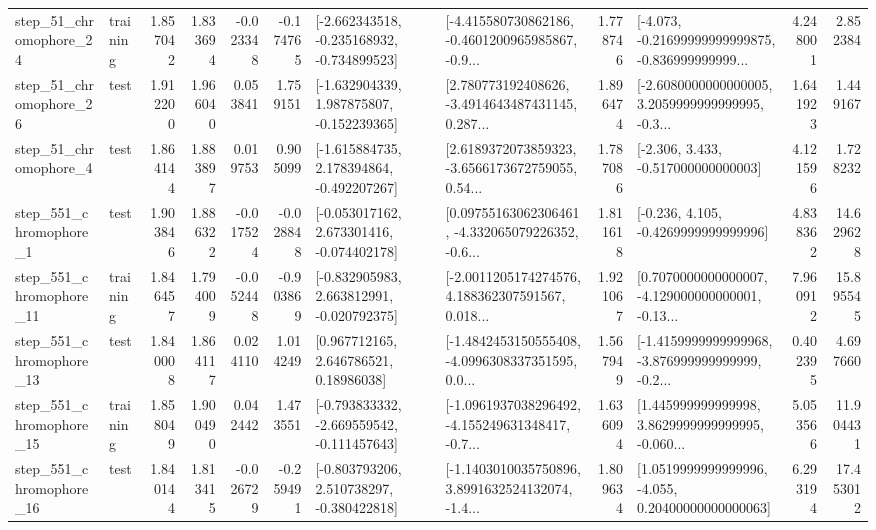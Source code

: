 \begin{tabular}{llrrrrllrlrr}
   step\_51\_chromophore\_24 &  training &      1.857042 &    1.833694 &     -0.023348 & -0.174765 &  [-2.662343518, -0.235168932, -0.734899523] &  [-4.415580730862186, -0.4601200965985867, -0.9... &       1.778746 &  [-4.073, -0.21699999999999875, -0.836999999999... &            4.248001 &          2.852384 \\
   step\_51\_chromophore\_26 &      test &      1.912200 &    1.966040 &      0.053841 &  1.759151 &   [-1.632904339, 1.987875807, -0.152239365] &  [2.780773192408626, -3.4914643487431145, 0.287... &       1.896474 &  [-2.6080000000000005, 3.2059999999999995, -0.3... &            1.641923 &          1.449167 \\
    step\_51\_chromophore\_4 &      test &      1.864144 &    1.883897 &      0.019753 &  0.905099 &   [-1.615884735, 2.178394864, -0.492207267] &  [2.6189372073859323, -3.6566173672759055, 0.54... &       1.787086 &                [-2.306, 3.433, -0.517000000000003] &            4.121596 &          1.728232 \\
   step\_551\_chromophore\_1 &      test &      1.903846 &    1.886322 &     -0.017524 & -0.028848 &   [-0.053017162, 2.673301416, -0.074402178] &  [0.09755163062306461, -4.332065079226352, -0.6... &       1.811618 &               [-0.236, 4.105, -0.4269999999999996] &            4.838362 &         14.629628 \\
  step\_551\_chromophore\_11 &  training &      1.846457 &    1.794009 &     -0.052448 & -0.903869 &   [-0.832905983, 2.663812991, -0.020792375] &  [-2.0011205174274576, 4.188362307591567, 0.018... &       1.921067 &  [0.7070000000000007, -4.129000000000001, -0.13... &            7.960912 &         15.895545 \\
  step\_551\_chromophore\_13 &      test &      1.840008 &    1.864117 &      0.024110 &  1.014249 &      [0.967712165, 2.646786521, 0.18986038] &  [-1.4842453150555408, -4.0996308337351595, 0.0... &       1.567949 &  [-1.4159999999999968, -3.876999999999999, -0.2... &            0.402395 &          4.697660 \\
  step\_551\_chromophore\_15 &  training &      1.858049 &    1.900490 &      0.042442 &  1.473551 &  [-0.793833332, -2.669559542, -0.111457643] &  [-1.0961937038296492, -4.155249631348417, -0.7... &       1.636094 &  [1.445999999999998, 3.8629999999999995, -0.060... &            5.053566 &         11.904431 \\
  step\_551\_chromophore\_16 &      test &      1.840144 &    1.813415 &     -0.026729 & -0.259491 &   [-0.803793206, 2.510738297, -0.380422818] &  [-1.1403010035750896, 3.8991632524132074, -1.4... &       1.809634 &  [1.0519999999999996, -4.055, 0.20400000000000063] &            6.293194 &         17.453012 \\

\end{tabular}
